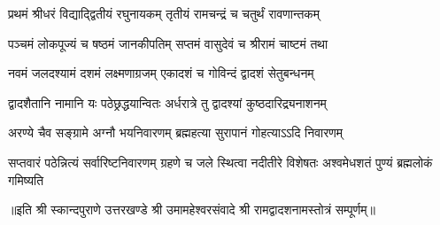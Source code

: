 

\twolineshloka
{प्रथमं श्रीधरं विद्याद्द्वितीयं रघुनायकम्}
{तृतीयं रामचन्द्रं च चतुर्थं रावणान्तकम्}

\twolineshloka
{पञ्चमं लोकपूज्यं च षष्ठमं जानकीपतिम्}
{सप्तमं वासुदेवं च श्रीरामं चाष्टमं तथा}

\twolineshloka
{नवमं जलदश्यामं दशमं लक्ष्मणाग्रजम्}
{एकादशं च गोविन्दं द्वादशं सेतुबन्धनम्}

\twolineshloka
{द्वादशैतानि नामानि यः पठेछ्रद्धयान्वितः}
{अर्धरात्रे तु द्वादश्यां कुष्ठदारिद्र्यनाशनम्}

\twolineshloka
{अरण्ये चैव सङ्ग्रामे अग्नौ भयनिवारणम्}
{ब्रह्महत्या सुरापानं गोहत्याऽऽदि निवारणम्}

\threelineshloka
{सप्तवारं पठेन्नित्यं सर्वारिष्टनिवारणम्}
{ग्रहणे च जले स्थित्वा नदीतीरे विशेषतः}
{अश्वमेधशतं पुण्यं ब्रह्मलोकं गमिष्यति}

॥इति श्री स्कान्दपुराणे उत्तरखण्डे श्री उमामहेश्वरसंवादे श्री रामद्वादशनामस्तोत्रं सम्पूर्णम्॥
